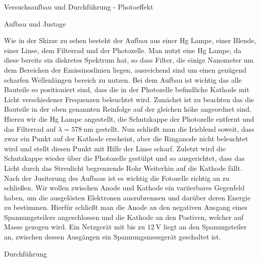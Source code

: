 \documentclass[pdftex, a4paper,11pt, twoside, ngerman]{report}
\begin{document}
  \begin{chapter}{Versuchsaufbau und Durchführung - Photoeffekt}
    \label{chp:Aufbau}
        
    \begin{section}{Aufbau und Justage}
      \label{chp:Aufbau:sec:ERSTERTEIL}
      

      Wie in der Skizze zu sehen besteht der Aufbau aus einer Hg Lampe, einer Blende, einer Linse, dem Filterrad und der Photozelle. Man nutzt eine Hg Lampe, da diese bereits ein diskretes Spektrum hat, so dass Filter, die einige Nanometer um dem Bereichen der Emissinoslinien liegen, ausreichend sind um einen genügend scharfen Wellenlängen bereich zu nutzen. Bei dem Aufbau ist wichtig das alle Bauteile so positioniert sind, dass die in der Photozelle befindliche Kathode mit Licht verschiedener Frequenzen beleuchtet wird. Zunächst ist zu beachten das die Bauteile in der oben genannten Reinfolge auf der gleichen höhe angeordnet sind. Hierzu wir die Hg Lampe angestellt, die Schutzkappe der Photozelle entfernt und das Filterrad auf $\lambda = \SI{578}{\nano\meter}$ gestellt. Nun schließt man die Irisblend soweit, dass zwar ein Punkt auf der Kathode erscheint, aber die Ringanode nicht beleuchtet wird und stellt diesen Punkt mit Hilfe der Linse scharf. Zuletzt wird die Schutzkappe wieder über die Photozelle gestülpt und so ausgerichtet, dass das Licht durch das Streulicht begrenzende Rohr Weiterhin auf die Kathode fällt. Nach der Jusiterung des Aufbaus ist es wichtig die Fotozelle richtig an zu schließen. Wir wollen zwischen Anode und Kathode ein variierbares Gegenfeld haben, um die ausgelösten Elektronen auszubremsen und darüber deren Energie zu bestimmen. Hierfür schließt man die Anode an den negativen Ausgang eines Spannungsteilers angeschlossen und die Kathode an den Postiven, welcher auf Masse gezogen wird. Ein Netzgerät mit bis zu $\SI{12}{\volt}$ liegt an den Spanungsteiler an, zwischen dessen Ausgängen ein Spannungsmessgerät geschaltet ist.
      
      \begin{section}{Durchführung}
        \label{chp:Aufbau:sec:ERSTERTEIL:subsec:UNTERTEIL}
       

\end{section}
\end{section}
\end{chapter}
\end{document}
